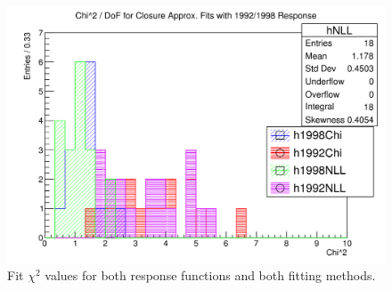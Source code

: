 \begin{figure}[h]
  \centering
  \includegraphics[width=0.8\linewidth]{figures/png/chiSq_of_fits.png}
  \caption{Fit $\chi^2$ values for both response functions and both fitting methods. }
  \label{fig:ChiSqOfFits}
\end{figure}





